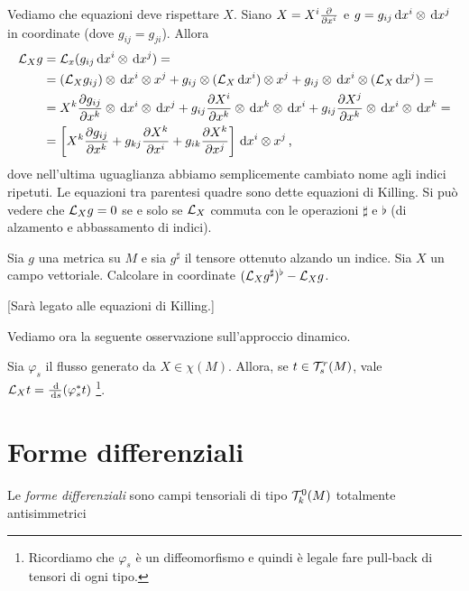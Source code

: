 \begin{example}
\begin{enumerate}
		Vediamo che equazioni deve rispettare $X$. Siano $X = X^i\frac{\partial }{\partial x^i}$ e $g = g_{ij}\,\mathrm d x^i \otimes \,\mathrm d x^j$ in coordinate (dove $g_{ij} = g_{ji}$).
		Allora
		\begin{align*}
		\mathcal L_Xg &= \mathcal L_x (g_{ij}\,\mathrm d x^i \otimes \,\mathrm d x^j) =\\
		&=(\mathcal L_Xg_{ij})\otimes \,\mathrm d x^i\otimes x^j + g_{ij} \otimes (\mathcal L_X\,\mathrm d x^i) \otimes x^j + g_{ij}\otimes \,\mathrm d x^i \otimes (\mathcal L_X\,\mathrm d x^j) =\\
		&= X^k \frac{\partial g_{ij}}{\partial x^k}\otimes \,\mathrm d x^i \otimes \,\mathrm d x^j + g_{ij}\frac{\partial X^i}{\partial x^k} \otimes \,\mathrm d x^k \otimes \,\mathrm d x^i + g_{ij} \frac{\partial X^j}{\partial x^k} \otimes \,\mathrm d x^i \otimes \,\mathrm d x^k =\\
		&= \left[X^k \frac{\partial g_{ij}}{\partial x^k} + g_{kj} \frac{\partial X^k}{\partial x^i} + g_{ik} \frac{\partial X^k}{\partial x^j} \right] \,\mathrm d x^i \otimes x^j \, \text{, }
		\end{align*}
		dove nell'ultima uguaglianza abbiamo semplicemente cambiato nome agli indici ripetuti. Le equazioni tra parentesi quadre sono dette equazioni di Killing. Si può vedere che $\mathcal L_Xg=0$ se e solo se $\mathcal L_X$ commuta con le operazioni $\sharp$ e $\flat$ (di alzamento e abbassamento di indici).
	\end{enumerate}
\end{example}

\begin{exercise}
	Sia $g$ una metrica su $M$ e sia $g^{\sharp}$ il tensore ottenuto alzando un indice. Sia $X$ un campo vettoriale. Calcolare in coordinate $(\mathcal L_X g^\sharp)^\flat - \mathcal L_X g$.
	
	[Sarà legato alle equazioni di Killing.]
\end{exercise}


Vediamo ora la seguente osservazione sull'approccio dinamico.
\begin{remark}
	Sia $\varphi_s$ il flusso generato da $X\in\chi(M)$. Allora, se $t\in\mathcal T_s^r(M)$, vale $\mathcal L_Xt = \frac{\,\mathrm d}{\,\mathrm d s} (\varphi_s^* t)$ \footnote{Ricordiamo che $\varphi_s$ è un diffeomorfismo e quindi è legale fare pull-back di tensori di ogni tipo.}.
\end{remark}


\chapter{Forme differenziali} %

\begin{definition} 
	Le \emph{forme differenziali} sono campi tensoriali di tipo $\mathcal T_k^0(M)$ totalmente antisimmetrici
\end{definition}

